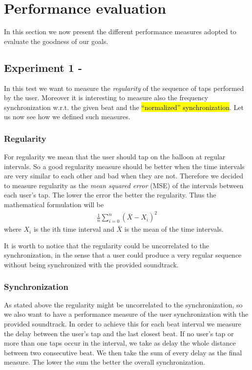 \section{Performance evaluation}
In this section we now present the different performance measures adopted to evaluate the goodness of our goals.

\subsection{Experiment 1 - \testfirst}
In this test we want to measure the \emph{regularity} of the sequence of taps performed by the user. Moreover it is interesting to measure also the frequency synchronization w.r.t. the given beat and the \hl{``normalized'' synchronization}. 
Let us now see how we defined such measures.
\subsubsection{Regularity}
For regularity we mean that the user should tap on the balloon at regular intervals. So a good regularity measure should be better when the time intervals are very similar to each other and bad when they are not. Therefore we decided to measure regularity as the \emph{mean squared error} (MSE) of the intervals between each user's tap.
The lower the error the better the regularity.
Thus the mathematical formulation will be
\begin{align}
	\frac{1}{n}\displaystyle\sum\limits_{i=0}^n(\bar{X}-X_i)^2
\end{align}
where $X_i$ is the ith time interval and $\bar{X}$ is the mean of the time intervals.

It is worth to notice that the regularity could be uncorrelated to the synchronization, in the sense that a user could produce a very regular sequence without being synchronized with the provided soundtrack.

\subsubsection{Synchronization}
As stated above the regularity might be uncorrelated to the synchronization, so we also want to have a performance measure of the user synchronization with the provided soundtrack.
In order to achieve this for each beat interval we measure the delay between the user's tap and the last closest beat.
If no user's tap or more than one taps occur in the interval, we take as delay the whole distance between two consecutive beat.
We then take the sum of every delay as the final measure.
The lower the sum the better the overall synchronization.

